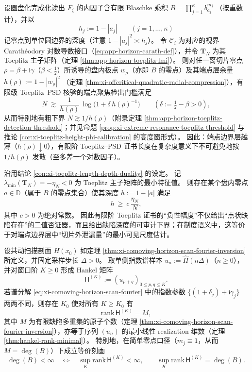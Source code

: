 \begin{proposition}\label{con:xi-toeplitz-length-depth-duality}
设圆盘化完成化读出 \(F_{\zeta}\) 的内因子含有限 Blaschke 乘积
\(
B=\prod_{j=1}^{\kappa}b_{a_j}^{m_j}
\)
（按重数计），并以
\[
h_j:=1-|a_j|
\qquad(j=1,\dots,\kappa)
\]
记零点到单位圆边界的深度（注意 \(1-|a_j|^2\asymp h_j\)）。
令 \(\mathscr{C}_{\zeta}\) 为对应的视界 Carath\'eodory 对数导数接口（\eqref{eq:app-horizon-carath-def}），并令 \(\mathbf{T}_N\) 为其 Toeplitz 主子矩阵（定理 \ref{thm:app-horizon-toeplitz-lmi}）。
则对任一离切片零点 \(\rho=\beta+\mathrm{i}\gamma\)（\(\beta<\tfrac12\)）所诱导的盘内极点 \(w_\rho\)（亦即 \(B\) 的零点）及其端点层余量
\(
h(\rho):=1-|w_\rho|^2
\)
（定理 \ref{thm:xi-offcritical-quadratic-radial-compression}），有限级 Toeplitz--PSD 核验的端点聚焦检出门槛满足
\[
N\ \gtrsim\ \frac{1}{h(\rho)}\,\log\!\bigl(1+\delta\,h(\rho)^{-1}\bigr)
\qquad(\delta:=\tfrac12-\beta>0),
\]
从而特别地有粗下界 \(N\gtrsim 1/h(\rho)\)（附录定理 \ref{thm:app-horizon-toeplitz-detection-threshold}；并见命题 \ref{prop:xi-extreme-resonance-toeplitz-threshold} 与推论 \ref{cor:xi-toeplitz-height-phi-calibration} 的高度窗形式）。
因此：端点边界层越薄（\(h(\rho)\downarrow 0\)），有限阶 Toeplitz--PSD 证书长度在复杂度意义下不可避免地按 \(1/h(\rho)\) 发散（至多差一个对数因子）。
\end{proposition}

\begin{proposition}\label{con:xi-toeplitz-negative-eigenvalue-controls-depth}
沿用结论 \ref{con:xi-toeplitz-length-depth-duality} 的设定。
记 \(\lambda_{\min}(\mathbf{T}_N)=-\eta_N<0\) 为 Toeplitz 主子矩阵的最小特征值。
则存在某个盘内零点 \(a\in\mathbb{D}\)（属于 \(B\) 的零点集合）使其深度 \(h:=1-|a|\) 满足
\[
h\ \ge\ c\,\frac{\eta_N}{N},
\]
其中 \(c>0\) 为绝对常数。
因此有限阶 Toeplitz 证书的“负性幅度”不仅给出“点状缺陷存在”的二值否证器，而且给出缺陷深度的可审计下界；在制度语义中，这等价于对端点边界层中“切片外泄漏量”的最小可见尺度估计。
\end{proposition}

\begin{proposition}[扫描 Hankel 秩 \(=\) 缺陷度：层析样本与 Blaschke 指数的同一化]\label{con:xi-scan-hankel-rank-equals-defect}
设共动扫描剖面 \(H(x_0)\) 如定理 \ref{thm:xi-comoving-horizon-scan-fourier-inversion} 所定义，并固定采样步长 \(\Delta>0\)。
取单侧指数谱样本 \(u_n:=\widehat H(n\Delta)\)（\(n\ge 0\)），并对窗口阶 \(K\ge 0\) 形成 Hankel 矩阵
\[
\mathsf{H}^{(K)}:=(u_{p+q})_{0\le p,q\le K}.
\]
若谱分解 \eqref{eq:xi-comoving-horizon-scan-fourier} 中的指数参数 \(\{(1+\delta_j)+\mathrm{i}\gamma_j\}\) 两两不同，则存在 \(K_0\) 使对所有 \(K\ge K_0\) 有
\[
\mathrm{rank}\,\mathsf{H}^{(K)}=M,
\]
其中 \(M\) 为有限缺陷多重集的原子个数（定理 \ref{thm:xi-comoving-horizon-scan-fourier-inversion}），亦等于序列 \((u_n)\) 的最小线性 realization 维数（定理 \ref{thm:hankel-rank-minimal}）。
特别地，在简单零点口径（\(m_j\equiv 1\)，从而 \(M=\deg(B)\)）下成立等价刻画
\[
\deg(B)<\infty\quad\Longleftrightarrow\quad
\sup_{K}\mathrm{rank}\,\mathsf{H}^{(K)}<\infty,
\qquad
\sup_{K}\mathrm{rank}\,\mathsf{H}^{(K)}=\deg(B).
\]
\end{proposition}

